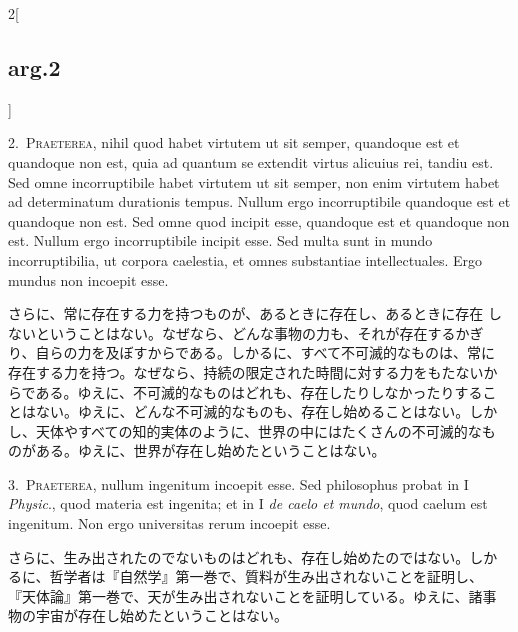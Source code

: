 \documentclass[paper=a4paper,fontsize=10pt,jafontsize=9pt,titlepage]{jlreq}
\begin{document}
\begin{paracol}{2}[\subsection{arg.2}]

2.~{\scshape Praeterea}, nihil quod habet virtutem ut sit
 semper, quandoque est et quandoque non est, quia ad quantum se extendit
 virtus alicuius rei, tandiu est. Sed omne incorruptibile habet virtutem
 ut sit semper, non enim virtutem habet ad determinatum durationis
 tempus. Nullum ergo incorruptibile quandoque est et quandoque non
 est. Sed omne quod incipit esse, quandoque est et quandoque non
 est. Nullum ergo incorruptibile incipit esse. Sed multa sunt in mundo
 incorruptibilia, ut corpora caelestia, et omnes substantiae
 intellectuales. Ergo mundus non incoepit esse.


\switchcolumn


さらに、常に存在する力を持つものが、あるときに存在し、あるときに存在
しないということはない。なぜなら、どんな事物の力も、それが存在するかぎ
り、自らの力を及ぼすからである。しかるに、すべて不可滅的なものは、常に
存在する力を持つ。なぜなら、持続の限定された時間に対する力をもたないか
らである。ゆえに、不可滅的なものはどれも、存在したりしなかったりするこ
とはない。ゆえに、どんな不可滅的なものも、存在し始めることはない。しか
し、天体やすべての知的実体のように、世界の中にはたくさんの不可滅的なも
のがある。ゆえに、世界が存在し始めたということはない。




3.~{\scshape Praeterea}, nullum ingenitum incoepit esse. Sed philosophus probat in I
 {\itshape Physic}., quod materia est ingenita; et in I {\itshape de caelo et mundo}, quod
 caelum est ingenitum. Non ergo universitas rerum incoepit esse.


\switchcolumn


さらに、生み出されたのでないものはどれも、存在し始めたのではない。しか
るに、哲学者は『自然学』第一巻で、質料が生み出されないことを証明し、
『天体論』第一巻で、天が生み出されないことを証明している。ゆえに、諸事
物の宇宙が存在し始めたということはない。





\end{paracol}
\end{document}

